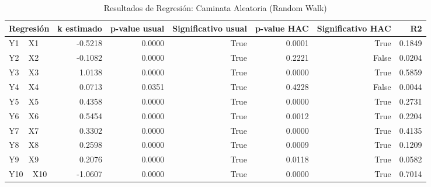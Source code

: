 \begin{table}
\caption{Resultados de Regresión: Caminata Aleatoria (Random Walk)}
\label{tab:res_iii}
\begin{tabular}{lrrrrrr}
\toprule
Regresión & k estimado & p-value usual & Significativo usual & p-value HAC & Significativo HAC & R2 \\
\midrule
Y1 ~ X1 & -0.5218 & 0.0000 & True & 0.0001 & True & 0.1849 \\
Y2 ~ X2 & -0.1082 & 0.0000 & True & 0.2221 & False & 0.0204 \\
Y3 ~ X3 & 1.0138 & 0.0000 & True & 0.0000 & True & 0.5859 \\
Y4 ~ X4 & 0.0713 & 0.0351 & True & 0.4228 & False & 0.0044 \\
Y5 ~ X5 & 0.4358 & 0.0000 & True & 0.0000 & True & 0.2731 \\
Y6 ~ X6 & 0.5454 & 0.0000 & True & 0.0012 & True & 0.2204 \\
Y7 ~ X7 & 0.3302 & 0.0000 & True & 0.0000 & True & 0.4135 \\
Y8 ~ X8 & 0.2598 & 0.0000 & True & 0.0009 & True & 0.1209 \\
Y9 ~ X9 & 0.2076 & 0.0000 & True & 0.0118 & True & 0.0582 \\
Y10 ~ X10 & -1.0607 & 0.0000 & True & 0.0000 & True & 0.7014 \\
\bottomrule
\end{tabular}
\end{table}
